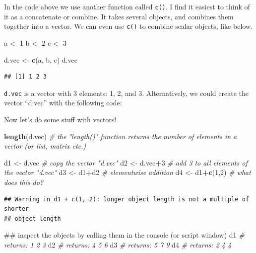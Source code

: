 \documentclass[]{article}
\newenvironment{Shaded}{\begin{snugshade}}{\end{snugshade}}
\newcommand{\KeywordTok}[1]{\textcolor[rgb]{0.13,0.29,0.53}{\textbf{#1}}}
\newcommand{\DecValTok}[1]{\textcolor[rgb]{0.00,0.00,0.81}{#1}}
\newcommand{\StringTok}[1]{\textcolor[rgb]{0.31,0.60,0.02}{#1}}
\newcommand{\CommentTok}[1]{\textcolor[rgb]{0.56,0.35,0.01}{\textit{#1}}}
\newcommand{\OperatorTok}[1]{\textcolor[rgb]{0.81,0.36,0.00}{\textbf{#1}}}
\newcommand{\NormalTok}[1]{#1}
\begin{document}
In the code above we use another function called \texttt{c()}. I find it
easiest to think of it as a concatenate or combine. It takes several
objects, and combines them together into a vector. We can even use
\texttt{c()} to combine scalar objects, like below.

\begin{Shaded}
\begin{Highlighting}[]
\NormalTok{a <-}\StringTok{ }\DecValTok{1}
\NormalTok{b <-}\StringTok{ }\DecValTok{2}
\NormalTok{c <-}\StringTok{ }\DecValTok{3}

\NormalTok{d.vec <-}\StringTok{ }\KeywordTok{c}\NormalTok{(a, b, c)}
\NormalTok{d.vec}
\end{Highlighting}
\end{Shaded}

\begin{verbatim}
## [1] 1 2 3
\end{verbatim}

\texttt{d.vec} is a vector with 3 elements: 1, 2, and 3. Alternatively,
we could create the vector ``d.vec'' with the following code:

Now let's do some stuff with vectors!

\begin{Shaded}
\begin{Highlighting}[]
\KeywordTok{length}\NormalTok{(d.vec)    }\CommentTok{# the "length()" function returns the number of elements in a vector (or list, matrix etc.)}

\NormalTok{d1 <-}\StringTok{ }\NormalTok{d.vec           }\CommentTok{# copy the vector "d.vec"}
\NormalTok{d2 <-}\StringTok{ }\NormalTok{d.vec}\OperatorTok{+}\DecValTok{3}         \CommentTok{# add 3 to all elements of the vector "d.vec"}
\NormalTok{d3 <-}\StringTok{ }\NormalTok{d1}\OperatorTok{+}\NormalTok{d2           }\CommentTok{# elementwise addition}
\NormalTok{d4 <-}\StringTok{ }\NormalTok{d1}\OperatorTok{+}\KeywordTok{c}\NormalTok{(}\DecValTok{1}\NormalTok{,}\DecValTok{2}\NormalTok{)       }\CommentTok{# what does this do?}
\end{Highlighting}
\end{Shaded}

\begin{verbatim}
## Warning in d1 + c(1, 2): longer object length is not a multiple of shorter
## object length
\end{verbatim}

\begin{Shaded}
\begin{Highlighting}[]
\NormalTok{## inspect the objects by calling them in the console (or script window)}
\NormalTok{d1    }\CommentTok{# returns: 1 2 3}
\NormalTok{d2    }\CommentTok{# returns: 4 5 6}
\NormalTok{d3    }\CommentTok{# returns: 5 7 9}
\NormalTok{d4    }\CommentTok{# returns: 2 4 4}
\end{Highlighting}
\end{Shaded}
\end{document}
